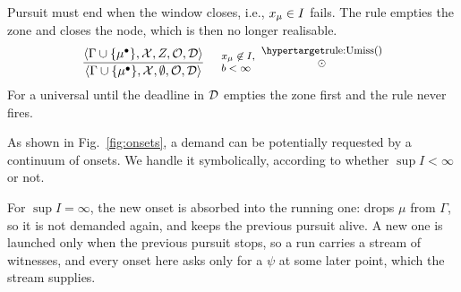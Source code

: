 Pursuit must end when the window closes, i.e., $x_\mu\in I$ fails. The rule  empties the zone and closes the node, which is then no longer realisable.
%
\vspace{-0.2cm}
\[
\footnotesize
\frac{\tup{\Gamma\cup\{\mu^\bullet\}}{\Ctx}{Z}{\obligations}{\Deadline}}
     {\tup{\Gamma\cup\{\mu^\bullet\}}{\Ctx}{\emptyset}{\obligations}{\Deadline}}
\quad
\begin{array}{l}
x_\mu\not\in\kI, \\ b<\infty
\end{array}
\shortstack{\ruleanchor{Umiss}\\\DETn}
\]
For a universal until the deadline in
$\mathcal{D}$ empties the zone first and the rule never fires.

%


As shown in Fig.~\ref{fig:onsets}, a demand can be potentially requested by a continuum of onsets. We handle it symbolically, according to whether $\sup I < \infty$ or not. 

\noindent
For $\sup I=\infty$, the new onset is absorbed into the running one:  drops
$\mu$ from $\Gamma$, so it is not demanded again, and keeps the previous pursuit alive. A new
one is launched only when the previous pursuit stops, so a run carries a stream of witnesses,
and every onset here asks only for a $\psi$ at some later point, which the stream supplies. 

